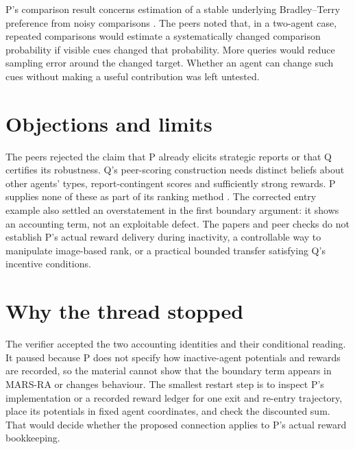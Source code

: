 \documentclass{article}
\begin{document}
P's comparison result concerns estimation of a stable underlying Bradley--Terry preference from noisy comparisons \cite{P}. The peers noted that, in a two-agent case, repeated comparisons would estimate a systematically changed comparison probability if visible cues changed that probability. More queries would reduce sampling error around the changed target. Whether an agent can change such cues without making a useful contribution was left untested.

\section{Objections and limits}

The peers rejected the claim that P already elicits strategic reports or that Q certifies its robustness. Q's peer-scoring construction needs distinct beliefs about other agents' types, report-contingent scores and sufficiently strong rewards. P supplies none of these as part of its ranking method \cite{Q,P}. The corrected entry example also settled an overstatement in the first boundary argument: it shows an accounting term, not an exploitable defect. The papers and peer checks do not establish P's actual reward delivery during inactivity, a controllable way to manipulate image-based rank, or a practical bounded transfer satisfying Q's incentive conditions.

\section{Why the thread stopped}

The verifier accepted the two accounting identities and their conditional reading. It paused because P does not specify how inactive-agent potentials and rewards are recorded, so the material cannot show that the boundary term appears in MARS-RA or changes behaviour. The smallest restart step is to inspect P's implementation or a recorded reward ledger for one exit and re-entry trajectory, place its potentials in fixed agent coordinates, and check the discounted sum. That would decide whether the proposed connection applies to P's actual reward bookkeeping.



\end{document}
